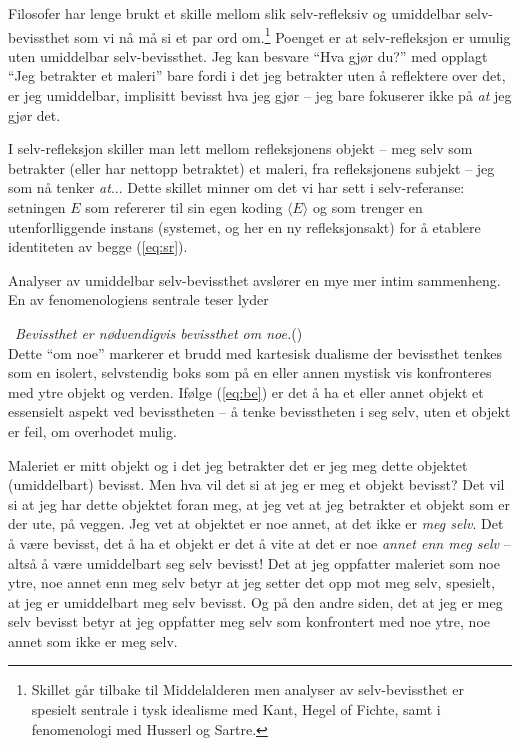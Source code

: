 \documentclass[10pt,twocolumn,leqno]{article}
\newcounter{EQ}
\newcommand{\equ}[1]{\refstepcounter{EQ}\vspace{.5ex}\par\noindent\ 
    \hfill #1\hfill{(\theEQ)}\\[.5ex]}
\newcommand{\refp}[1]{(\ref{#1})}
\newcommand{\<}{\langle}
\renewcommand{\>}{\rangle}
\begin{document}
Filosofer har lenge brukt et skille mellom slik selv-refleksiv
og umiddelbar selv-bevissthet som vi n{\aa} m{\aa} si et par ord 
om.\footnote{Skillet g{\aa}r tilbake til Middelalderen men 
analyser av selv-bevissthet er spesielt sentrale i tysk 
idealisme med Kant, Hegel of Fichte, samt i fenomenologi 
med Husserl og Sartre.} Poenget er at selv-refleksjon er umulig uten 
umiddelbar selv-bevissthet. Jeg kan besvare ``Hva 
gj{\o}r du?'' med opplagt ``Jeg betrakter et maleri'' bare fordi i det jeg 
betrakter uten {\aa} reflektere over det, er jeg umiddelbar, implisitt bevisst hva 
jeg gj{\o}r -- jeg bare fokuserer ikke p{\aa} {\em at} jeg gj{\o}r det.

I selv-refleksjon skiller man lett mellom refleksjonens objekt -- 
meg selv som betrakter (eller har nettopp betraktet) et maleri, fra refleksjonens
subjekt -- jeg som n{\aa} tenker {\em at}... Dette skillet minner
om det vi har sett i selv-referanse: setningen $E$ som refererer til 
sin egen koding $\<E\>$ og som trenger en utenforlliggende instans (systemet, og her 
en ny refleksjonsakt) for {\aa} etablere identiteten av begge \refp{eq:sr}.
 
Analyser av umiddelbar selv-bevissthet 
avsl{\o}rer en mye mer intim sammenheng. En av fenomenologiens sentrale 
teser lyder 
\equ{{\em{Bevissthet er n{\o}dvendigvis bevissthet {\em om noe}.}}}\label{eq:be}
Dette ``om noe'' markerer et brudd med kartesisk dualisme der 
bevissthet tenkes som en isolert, selv\-sten\-dig boks som p{\aa} en eller 
annen mystisk vis konfronteres med ytre objekt og verden. If{\o}lge 
\refp{eq:be} er det {\aa} ha et eller annet objekt et essensielt aspekt 
ved bevisstheten -- {\aa} tenke bevisstheten i seg selv, uten et objekt er 
feil, om overhodet mulig.

Maleriet er mitt objekt og i det jeg betrakter det er jeg meg dette 
objektet (umiddelbart) bevisst. Men hva vil det si at jeg er meg et objekt 
bevisst? Det vil si at jeg har dette objektet foran meg, at jeg vet at jeg 
betrakter et objekt som er der ute, p{\aa} veggen. 
Jeg vet at objektet er noe annet, at det ikke er {\em meg selv}.
Det {\aa} v{\ae}re bevisst, det {\aa} ha et objekt er det {\aa} vite 
at det er noe {\em annet enn meg selv} -- alts{\aa} {\aa} v{\ae}re umiddelbart 
seg selv bevisst! 
Det at jeg oppfatter maleriet som noe ytre, noe annet enn meg selv betyr
at jeg setter det opp mot meg selv, spesielt, at jeg er umiddelbart 
meg selv bevisst. Og p{\aa} den andre siden, det at jeg er meg selv bevisst 
betyr at jeg oppfatter meg selv som konfrontert med noe 
ytre, noe annet som ikke er meg selv.
\end{document}
